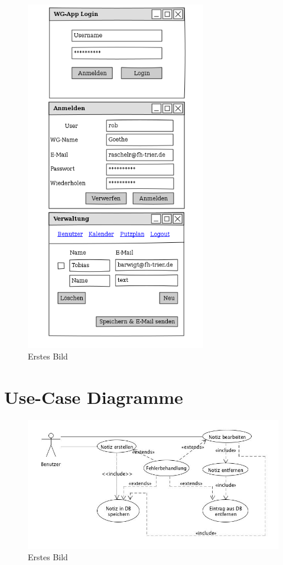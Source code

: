 \begin{figure}[H] 
  \centering
     \includegraphics[width=0.7\textwidth]{anhang/mockups/webpage.png}
  \caption{Erstes Bild}
  \label{fig:Bild1}
\end{figure}

\newpage
\section{Use-Case Diagramme}
\begin{figure}[H] 
  \centering
     \includegraphics[width=\textwidth]{anhang/usecases/diagramme/teamprojekt14_uc_Blackboard.jpg}
  \caption{Erstes Bild}
  \label{fig:Bild1}
\end{figure}

